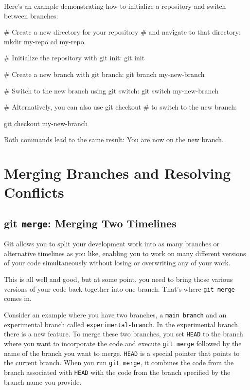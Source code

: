 \documentclass[
  letterpaper,
  DIV=11,
  numbers=noendperiod]{scrreprt}
\newenvironment{Shaded}{\begin{snugshade}}{\end{snugshade}}
\newcommand{\BuiltInTok}[1]{\textcolor[rgb]{0.00,0.23,0.31}{#1}}
\newcommand{\CommentTok}[1]{\textcolor[rgb]{0.37,0.37,0.37}{#1}}
\newcommand{\FunctionTok}[1]{\textcolor[rgb]{0.28,0.35,0.67}{#1}}
\newcommand{\NormalTok}[1]{\textcolor[rgb]{0.00,0.23,0.31}{#1}}
\begin{document}
Here's an example demonstrating how to initialize a repository and
switch between branches:

\begin{Shaded}
\begin{Highlighting}[]
\CommentTok{\# Create a new directory for your repository}
\CommentTok{\# and navigate to that directory:}
\FunctionTok{mkdir}\NormalTok{ my{-}repo}
\BuiltInTok{cd}\NormalTok{ my{-}repo}

\CommentTok{\# Initialize the repository with git init:}
\FunctionTok{git}\NormalTok{ init}

\CommentTok{\# Create a new branch with git branch:}
\FunctionTok{git}\NormalTok{ branch my{-}new{-}branch}

\CommentTok{\# Switch to the new branch using git switch:}
\FunctionTok{git}\NormalTok{ switch my{-}new{-}branch}

\CommentTok{\# Alternatively, you can also use git checkout}
\CommentTok{\# to switch to the new branch:}

\FunctionTok{git}\NormalTok{ checkout my{-}new{-}branch}
\end{Highlighting}
\end{Shaded}

Both commands lead to the same result: You are now on the new branch.

\section{Merging Branches and Resolving
Conflicts}\label{merging-branches-and-resolving-conflicts}

\subsection{\texorpdfstring{git \texttt{merge}: Merging Two
Timelines}{git merge: Merging Two Timelines}}\label{git-merge-merging-two-timelines}

Git allows you to split your development work into as many branches or
alternative timelines as you like, enabling you to work on many
different versions of your code simultaneously without losing or
overwriting any of your work.

This is all well and good, but at some point, you need to bring those
various versions of your code back together into one branch. That's
where \texttt{git\ merge} comes in.

Consider an example where you have two branches, a \texttt{main\ branch}
and an experimental branch called \texttt{experimental-branch}. In the
experimental branch, there is a new feature. To merge these two
branches, you set \texttt{HEAD} to the branch where you want to
incorporate the code and execute \texttt{git\ merge} followed by the
name of the branch you want to merge. \texttt{HEAD} is a special pointer
that points to the current branch. When you run \texttt{git\ merge}, it
combines the code from the branch associated with \texttt{HEAD} with the
code from the branch specified by the branch name you provide.
\end{document}
